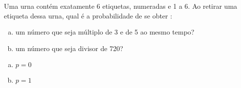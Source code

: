 \begin{ex}
Uma urna contém exatamente 6 etiquetas, numeradas e 1 a 6. Ao retirar uma etiqueta dessa urna, qual é a probabilidade de se obter :
   \begin{enumerate}[(a)]
   \item um número que seja múltiplo de 3 e de 5 ao mesmo tempo?
   \item um número que seja divisor de 720?
   \end{enumerate}
     \begin{sol}
      \phantom{A}
        \begin{enumerate}  [(a)]
            \item $p=0$
            \item $p=1$
        \end{enumerate}
     \end{sol}
\end{ex}